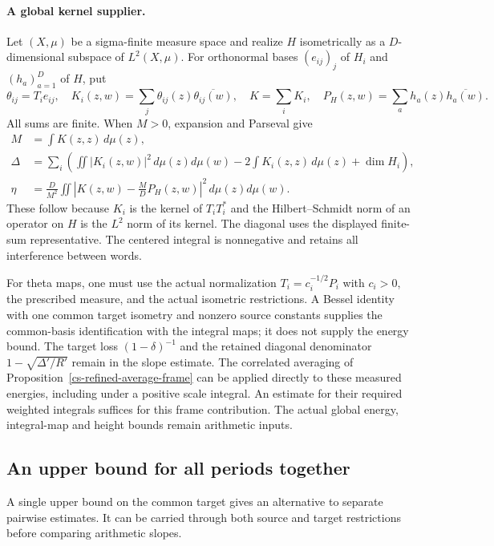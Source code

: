 \paragraph{A global kernel supplier.}
Let $(X,\mu)$ be a sigma-finite measure space and realize $H$
isometrically as a $D$-dimensional subspace of $L^2(X,\mu)$.
For orthonormal bases $(e_{ij})_j$ of $H_i$ and $(h_a)_{a=1}^D$
of $H$, put
\[
 \theta_{ij}=T_ie_{ij},\quad
 K_i(z,w)=\sum_j\theta_{ij}(z)\overline{\theta_{ij}(w)},\quad
 K=\sum_iK_i,\quad
 P_H(z,w)=\sum_a h_a(z)\overline{h_a(w)}.
\]
All sums are finite. When $M>0$, expansion and Parseval give
\begin{align*}
 M&=\int K(z,z)\,d\mu(z),\\
 \Delta&=\sum_i\left(\iint|K_i(z,w)|^2\,d\mu(z)d\mu(w)
          -2\int K_i(z,z)\,d\mu(z)+\dim H_i\right),\\
 \eta&=\frac D{M^2}\iint
       \left|K(z,w)-\frac MD P_H(z,w)\right|^2
                         \,d\mu(z)d\mu(w).
\end{align*}
These follow because $K_i$ is the kernel of $T_iT_i^*$ and
the Hilbert--Schmidt norm of an operator on $H$ is the $L^2$ norm
of its kernel. The diagonal uses the displayed finite-sum
representative. The centered integral is nonnegative and retains
all interference between words.

For theta maps, one must use the actual normalization
$T_i=c_i^{-1/2}P_i$ with $c_i>0$, the prescribed measure, and the
actual isometric restrictions. A Bessel identity with one common
target isometry and nonzero source constants supplies the common-basis
identification with the integral maps; it does not supply the energy
bound. The target loss $(1-\delta)^{-1}$ and the retained diagonal
denominator $1-\sqrt{\Delta'/R'}$ remain in the slope estimate.
The correlated averaging of Proposition~\ref{cs-refined-average-frame}
can be applied directly to these measured energies, including under a
positive scale integral. An estimate for their required weighted
integrals suffices for this frame contribution. The actual global
energy, integral-map and height bounds remain arithmetic inputs.


\subsection{An upper bound for all periods together}

A single upper bound on the common target gives an alternative to
separate pairwise estimates. It can be carried through both source
and target restrictions before comparing arithmetic slopes.

